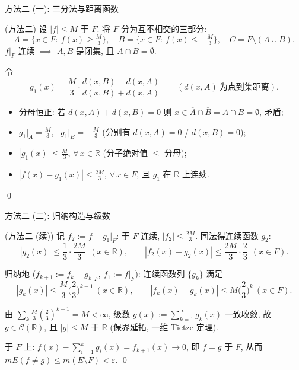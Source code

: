 
\begin{frame}{方法二 (一): 三分法与距离函数}

\startproof[bg=yellow, fg=red](方法二)
设 $|f| \leqslant M$ 于 $F$. 将 $F$ 分为互不相交的三部分:
\[
A = \{x \in F:\ f(x) \geqslant \tfrac{M}{3}\},\quad
B = \{x \in F:\ f(x) \leqslant -\tfrac{M}{3}\},\quad
C = F \setminus (A \cup B).
\]
$f\big|_F$ 连续 $\implies$ $A, B$ 是\alert{闭}集, 且 $A \cap B = \emptyset$.

\pause

令
\[
g_1(x) = \frac{M}{3} \cdot
\frac{d(x, B) - d(x, A)}{d(x, B) + d(x, A)}
\qquad
(d(x, A)\ \text{为点到集距离}).
\]

\pause

\begin{itemize}
\item 分母恒正: 若 $d(x,A) + d(x,B) = 0$ 则 $x \in \overline{A} \cap \overline{B} = A \cap B = \emptyset$, 矛盾;
\item $g_1\big|_A = \frac{M}{3}$, \ $g_1\big|_B = -\frac{M}{3}$ (分别有 $d(x,A) = 0$ / $d(x,B) = 0$);
\item $|g_1(x)| \leqslant \frac{M}{3}$, $\forall\, x \in \mathbb{R}$ (分子绝对值 $\leqslant$ 分母);
\item $|f(x) - g_1(x)| \leqslant \frac{2M}{3}$, $\forall\, x \in F$, 且 $g_1$ 在 $\mathbb{R}$ 上连续.
\end{itemize}
\qed

\end{frame}


\begin{frame}{方法二 (二): 归纳构造与级数}

\startproof[bg=yellow, fg=red](方法二 (续))
记 $f_2 := f - g_1\big|_F$: 于 $F$ 连续, $|f_2| \leqslant \frac{2M}{3}$. 同法得连续函数 $g_2$:
\[
|g_2(x)| \leqslant \frac{1}{3} \cdot \frac{2M}{3}\ \ (x \in \mathbb{R}),
\qquad
|f_2(x) - g_2(x)| \leqslant \frac{2M}{3} \cdot \frac{2}{3}\ \ (x \in F).
\]

\pause

归纳地 ($f_{k+1} := f_k - g_k\big|_F$, $f_1 := f\big|_F$): 连续函数列 $\{g_k\}$ 满足
\[
|g_k(x)| \leqslant \frac{M}{3} \Big(\frac{2}{3}\Big)^{k-1}\ (x \in \mathbb{R}),
\qquad
|f_k(x) - g_k(x)| \leqslant M \Big(\frac{2}{3}\Big)^{k}\ (x \in F).
\]

\pause

由 $\sum_k \frac{M}{3} (\frac{2}{3})^{k-1} = M < \infty$, 级数 $g(x) := \sum_{k=1}^{\infty} g_k(x)$
\alert{一致收敛}, 故 $g \in \mathcal{C}(\mathbb{R})$, 且 $|g| \leqslant M$ 于 $\mathbb{R}$
(\alert{保界延拓}, 一维 Tietze 定理).

\pause

于 $F$ 上: $f(x) - \sum_{i=1}^{k} g_i(x) = f_{k+1}(x) \to 0$, 即 $f = g$ 于 $F$,
从而 $mE(f \neq g) \leqslant m(E \setminus F) < \varepsilon$.
\qed

\end{frame}

